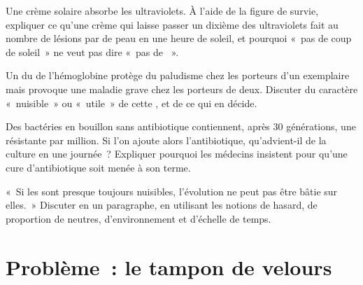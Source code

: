 \begin{exercise}[$\star\star\star$]\label{exo:g11:mutations:12}
Une crème solaire absorbe les ultraviolets. À l'aide de la figure de
survie, expliquer ce qu'une crème qui laisse passer un dixième des
ultraviolets fait au nombre de lésions par  de peau en une heure
de soleil, et pourquoi «~pas de coup de soleil~» ne veut pas dire
«~pas de ~».
\end{exercise}

\begin{exercise}[$\star\star\star$]\label{exo:g11:mutations:13}
Un  du  de l'hémoglobine protège du paludisme chez les
porteurs d'un exemplaire mais provoque une maladie grave chez les
porteurs de deux. Discuter du caractère «~nuisible~» ou «~utile~» de
cette , et de ce qui en décide.
\end{exercise}

\begin{exercise}[$\star\star\star$]\label{exo:g11:mutations:14}
Des bactéries en bouillon sans antibiotique contiennent, après 30
générations, une  résistante par million. Si l'on ajoute alors
l'antibiotique, qu'advient-il de la culture en une journée~? Expliquer
pourquoi les médecins insistent pour qu'une cure d'antibiotique soit
menée à son terme.
\end{exercise}

\begin{exercise}[$\star\star\star$]\label{exo:g11:mutations:15}
«~Si les  sont presque toujours nuisibles, l'évolution ne peut
pas être bâtie sur elles.~» Discuter en un paragraphe, en utilisant les
notions de hasard, de proportion de  neutres,
d'environnement et d'échelle de temps.
\end{exercise}

\section{Problème~: le tampon de velours}

